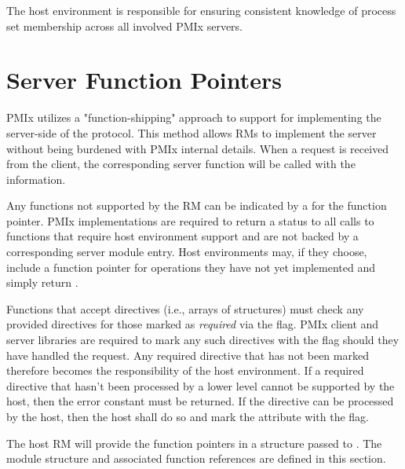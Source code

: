 \advicermstart
The host environment is responsible for ensuring consistent knowledge of
process set membership across all involved \ac{PMIx} servers.
\advicermend


\section{Server Function Pointers}

\label{chap:server:func_pointers}

\ac{PMIx} utilizes a "function-shipping" approach to support for implementing the server-side of the protocol. This method allows \acp{RM} to implement the server without being burdened with \ac{PMIx} internal details. When a request is received from the client, the corresponding server function will be called with the information.

Any functions not supported by the \ac{RM} can be indicated by a  for the function pointer. \ac{PMIx} implementations are required to return a  status to all calls to functions that require host environment support and are not backed by a corresponding server module entry. Host environments may, if they choose, include a function pointer for operations they have not yet implemented and simply return .

Functions that accept directives (i.e., arrays of  structures) must check any provided directives for those marked as \emph{required} via the  flag. \ac{PMIx} client and server libraries are required to mark any such directives with the  flag should they have handled the request. Any required directive that has not been marked therefore becomes the responsibility of the host environment. If a required directive that hasn't been processed by a lower level cannot be supported by the host, then the  error constant must be returned. If the directive can be processed by the host, then the host shall do so and mark the attribute with the  flag.

The host \ac{RM} will provide the function pointers in a  structure passed to .
The module structure and associated function references are defined in this section.


